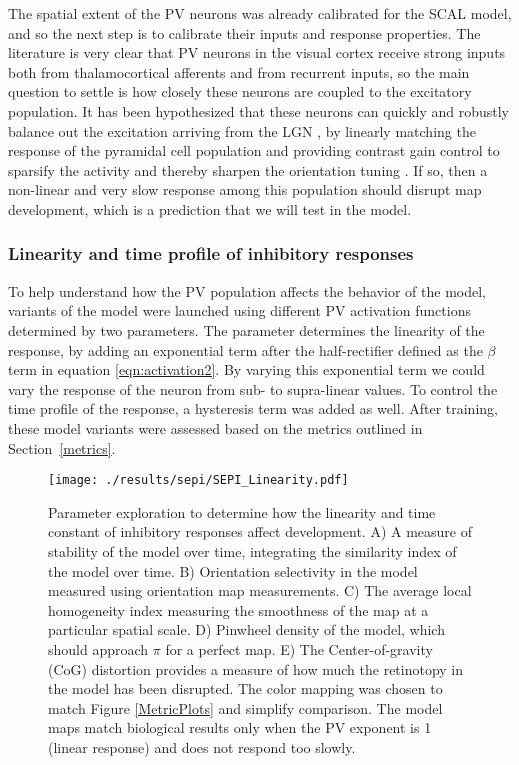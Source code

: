 The spatial extent of the PV neurons was already calibrated for the
SCAL model, and so the next step is to calibrate their inputs and
response properties. The literature is very clear that PV neurons in
the visual cortex receive strong inputs both from thalamocortical
afferents and from recurrent inputs, so the main question to settle is
how closely these neurons are coupled to the excitatory population. It
has been hypothesized that these neurons can quickly and robustly
balance out the excitation arriving from the LGN \citep{Swadlow2003,
  Burkhalter2008}, by linearly matching the response of the pyramidal
cell population and providing contrast gain control to sparsify the
activity and thereby sharpen the orientation tuning
\citep{Wilson2012}.  If so, then a non-linear and very slow response
among this population should disrupt map development, which is a
prediction that we will test in the model.

\subsubsection*{Linearity and time profile of inhibitory responses}

To help understand how the PV population affects the behavior of the
model, variants of the model were launched using different PV
activation functions determined by two parameters. The parameter
determines the linearity of the response, by adding an exponential
term after the half-rectifier defined as the $\beta$ term in equation
\ref{eqn:activation2}. By varying this exponential term we could vary
the response of the neuron from sub- to supra-linear values. To
control the time profile of the response, a hysteresis term was added
as well. After training, these model variants were assessed based on
the metrics outlined in Section~\ref{metrics}.

\begin{figure}
	\centering
        \texttt{[image: ./results/sepi/SEPI\_Linearity.pdf]}
	\caption[Analysis of development in SEPI model when varying time
      constant and linearity of responses]{Parameter exploration to
      determine how the linearity and time constant of inhibitory
      responses affect development. A) A measure of stability of the
      model over time, integrating the similarity index of the model
      over time. B) Orientation selectivity in the model measured
      using orientation map measurements. C) The average local
      homogeneity index measuring the smoothness of the map at a
      particular spatial scale. D) Pinwheel density of the model,
      which should approach $\pi$ for a perfect map. E) The
      Center-of-gravity (CoG) distortion provides a measure of how
      much the retinotopy in the model has been disrupted. The color
      mapping was chosen to match Figure \ref{MetricPlots} and
      simplify comparison. The model maps match biological results
      only when the PV exponent is 1 (linear response) and does not
      respond too slowly.}
	\label{SEPILinearity}
\end{figure}

